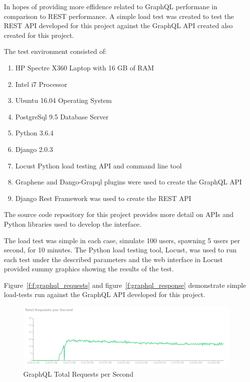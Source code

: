 In hopes of providing more effidence related to GraphQL performane in 
comparison to REST performance.  A simple load test was created to test 
the REST API developed for this project against the GraphQL API created also 
created for this project.

The test environment consisted of:
\begin{enumerate}
\item HP Spectre X360 Laptop with 16 GB of RAM
\item Intel i7 Processor
\item Ubuntu 16.04 Operating System
\item PostgreSql 9.5 Database Server
\item Python 3.6.4
\item Django 2.0.3
\item Locust Python load testing API and command line tool
\item Graphene and Dango-Grapql plugins were used to create the GraphQL API
\item Django Rest Framework was used to create the REST API
\end{enumerate}
The source code repository for this project provides more detail on APIs and 
Python libraries used to develop the interface.

The load test was simple in each case, simulate 100 users, spawning 5 users 
per second, for 10 minutes.  The Python load testing tool, Locust, was used 
to run each test under the described parameters and the web interface in 
Locust provided summy graphics showing the results of the test.

Figure~\ref{f:f:graphql_requests} and figure~\ref{f:graphql_response} 
demonstrate simple load-tests run against the GraphQL API developed for this 
project.

\begin{figure}[htb]
  \centering\includegraphics[width=\columnwidth]
  {./images/graphql_requests.png}
  \caption{GraphQL Total Requests per Second}\label{f:graphql_requests}
\end{figure}

